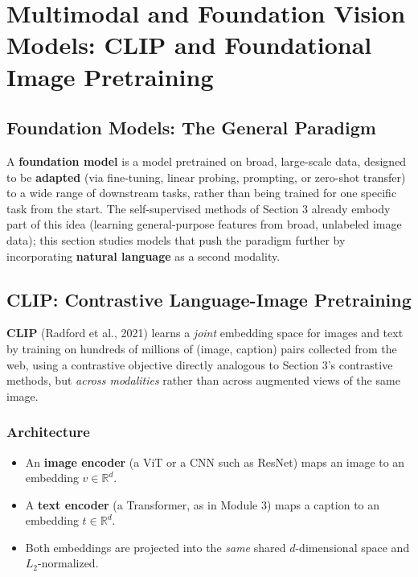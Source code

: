 \documentclass[12pt,a4paper]{article}
\begin{document}
\newpage

\section{Multimodal and Foundation Vision Models: CLIP and Foundational Image Pretraining}

\subsection{Foundation Models: The General Paradigm}

\begin{defbox}
A \textbf{foundation model} is a model pretrained on broad, large-scale data, designed to be \textbf{adapted} (via fine-tuning, linear probing, prompting, or zero-shot transfer) to a wide range of downstream tasks, rather than being trained for one specific task from the start. The self-supervised methods of Section 3 already embody part of this idea (learning general-purpose features from broad, unlabeled image data); this section studies models that push the paradigm further by incorporating \textbf{natural language} as a second modality.
\end{defbox}

\subsection{CLIP: Contrastive Language-Image Pretraining}

\textbf{CLIP} (Radford et al., 2021) learns a \emph{joint} embedding space for images and text by training on hundreds of millions of (image, caption) pairs collected from the web, using a contrastive objective directly analogous to Section 3's contrastive methods, but \emph{across modalities} rather than across augmented views of the same image.

\subsubsection{Architecture}

\begin{itemize}[leftmargin=1.5em]
    \item An \textbf{image encoder} (a ViT or a CNN such as ResNet) maps an image to an embedding $v \in \mathbb{R}^d$.
    \item A \textbf{text encoder} (a Transformer, as in Module 3) maps a caption to an embedding $t \in \mathbb{R}^d$.
    \item Both embeddings are projected into the \emph{same} shared $d$-dimensional space and $L_2$-normalized.
\end{itemize}
\end{document}
